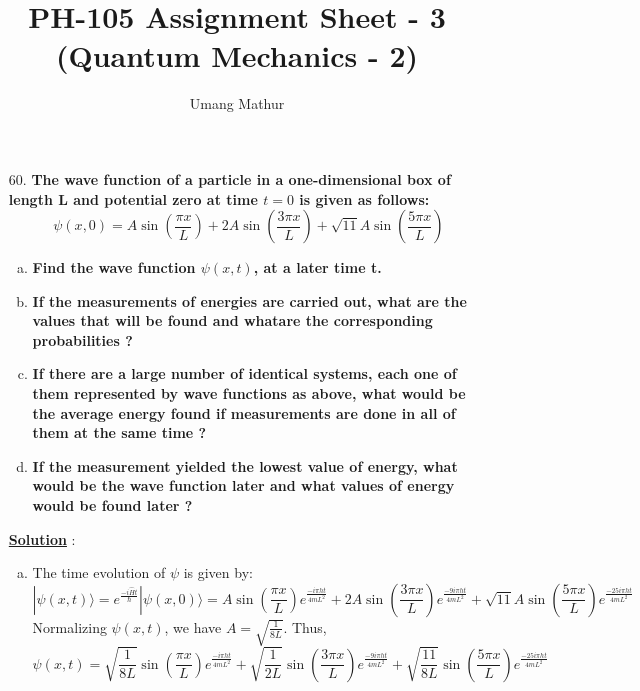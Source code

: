 \documentclass[10pt, a4paper]{article}
\begin{document}
	\title{PH-105 Assignment Sheet - 3 (Quantum Mechanics - 2)}
	\date{}
	\author{Umang Mathur}
	\maketitle
	\begin{enumerate}
		\item[60.] {\bf The wave function of a particle in a one-dimensional box of length L and potential zero at time $t = 0$ is given as follows:}
			\[\psi(x,0) = A\sin(\frac{\pi x}{L}) + 2A\sin(\frac{3\pi x}{L}) + \sqrt{11}A\sin(\frac{5\pi x}{L})\]
			\begin{enumerate}[(a)]
				\item {\bf Find the wave function $\psi(x,t)$, at a later time t.}
				\item {\bf If the measurements of energies are carried out, what are the values that will be found and whatare the corresponding probabilities ?}
				\item {\bf If there are a large number of identical systems, each one of them represented by wave functions as above, what would be the average energy found if measurements are done in all of them at the same time ?}
				\item {\bf If the measurement yielded the lowest value of energy, what would be the wave function later and what values of energy would be found later ?}
			\end{enumerate}
			
		{\underline {\bf Solution}} :\\
		
		\begin{enumerate}[(a)]
			\item The time evolution of $\psi$ is given by:
			\[|\psi(x,t) \rangle = e^{\frac{-i\hat{H}t}{\hbar}}|\psi(x,0) \rangle = A\sin(\frac{\pi x}{L})e^{\frac{-i\pi ht}{4mL^2}} + 2A\sin(\frac{3\pi x}{L})e^{\frac{-9i\pi ht}{4mL^2}} + \sqrt{11}A\sin(\frac{5\pi x}{L})e^{\frac{-25i\pi ht}{4mL^2}} \]
			Normalizing $\psi(x,t)$, we have $A = \sqrt{\frac{1}{8L}}$. Thus,
			\[\psi(x,t) = \sqrt{\frac{1}{8L}}\sin(\frac{\pi x}{L})e^{\frac{-i\pi ht}{4mL^2}} + \sqrt{\frac{1}{2L}}\sin(\frac{3\pi x}{L})e^{\frac{-9i\pi ht}{4mL^2}} + \sqrt{\frac{11}{8L}}\sin(\frac{5\pi x}{L})e^{\frac{-25i\pi ht}{4mL^2}} \]
			

\end{enumerate}
\end{enumerate}
\end{document}
